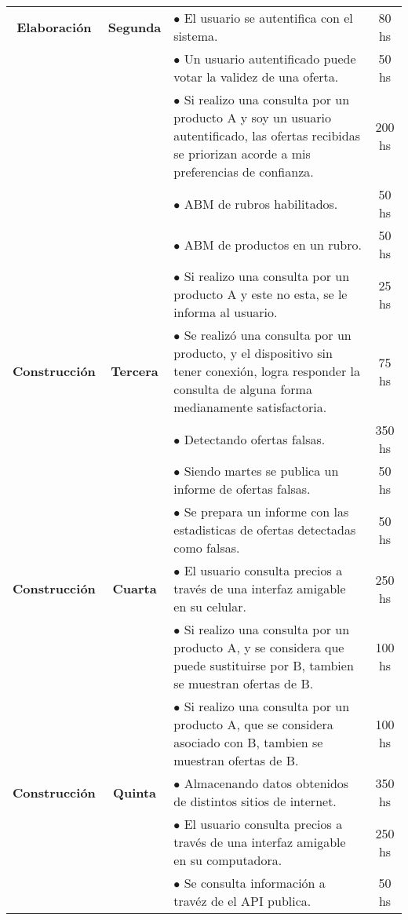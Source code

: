 \begin{center}
\begin{tabular}{| c | c | p{10cm} | c |}
		\hline
		\textbf{Elaboración} & \textbf{Segunda}& $\bullet$ El usuario se autentifica con el sistema. & 80 hs \\
								& & $\bullet$ Un usuario autentificado puede votar la validez de una oferta. &  50 hs \\
								& & $\bullet$ Si realizo una consulta por un producto A y soy un usuario autentificado, las ofertas recibidas se priorizan acorde a mis preferencias de confianza. & 200 hs \\
								& & $\bullet$ ABM de rubros habilitados. & 50 hs \\
								& & $\bullet$ ABM de productos en un rubro. & 50 hs \\
								& & $\bullet$ Si realizo una consulta por un producto A y este no esta, se le informa al usuario. & 25 hs \\

		\hline
		\textbf{Construcción} & \textbf{Tercera}& $\bullet$ Se realizó una consulta por un producto, y el dispositivo sin tener conexión, logra responder la consulta de alguna forma medianamente satisfactoria. & 75 hs \\
								& & $\bullet$ Detectando ofertas falsas. & 350 hs\\
								& & $\bullet$ Siendo martes se publica un informe de ofertas falsas. & 50 hs \\
								& & $\bullet$ Se prepara un informe con las estadisticas de ofertas detectadas como falsas. & 50 hs\\

		\hline
		\textbf{Construcción} & \textbf{Cuarta}& $\bullet$ El usuario consulta precios a través de una interfaz amigable en su celular. & 250 hs \\
						& 	 & $\bullet$ Si realizo una consulta por un producto A, y se considera que puede sustituirse por B, tambien se muestran ofertas de B. & 100 hs \\
						& 	 & $\bullet$ Si realizo una consulta por un producto A, que se considera asociado con B, tambien se muestran ofertas de B. & 100 hs \\

		\hline
		\textbf{Construcción} & \textbf{Quinta}& $\bullet$ Almacenando datos obtenidos de distintos sitios de internet. & 350 hs \\
						&	 & $\bullet$ El usuario consulta precios a través de una interfaz amigable en su computadora. & 250 hs \\
						&	 & $\bullet$ Se consulta información a travéz de el API publica. & 50 hs \\

		\hline
	\end{tabular}
\end{center}

